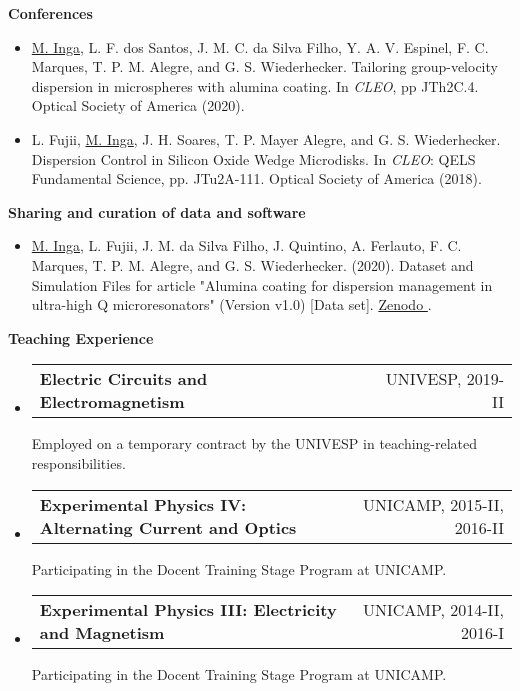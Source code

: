 \documentclass[letterpaper, 12pt]{article}[leftmargin=*]
\makeatletter
\renewcommand{\section}[2]{
  \colorbox{secondary}{\color{white}\raggedbottom\normalsize\textbf{{#1}{\hspace{7pt}#2}}}
}
\newcommand{\resumeEntryStart}{\begin{itemize}[leftmargin=2.5mm]\itemsep8pt}
\newcommand{\resumeEntryEnd}{\end{itemize}}
\newcommand{\resumeItemListStart}{\begin{itemize}[leftmargin=4.5mm]\itemsep-3pt}
\newcommand{\resumeItemListEnd}{\end{itemize}}
\newcommand{\resumeItem}[1]{
  \item\small{
    {#1}
  }
}
\newcommand{\resumeEntryTD}[2]{
  \item[]
    \begin{tabularx}{0.97\textwidth}{X@{\hspace{60pt}}r}
      \textbf{\color{primary}#1} & {\firabook\color{accent}\small#2}
    \end{tabularx}\vspace{2pt}
}
\makeatother
\begin{document}
\textbf{Conferences}
\vspace{-3pt}
\resumeItemListStart
\resumeItem {\underline{M. Inga}, L. F. dos Santos, J. M. C. da Silva Filho, Y. A. V. Espinel, F. C. Marques, T. P. M. Alegre, and G. S. Wiederhecker. Tailoring group-velocity dispersion in microspheres with alumina coating. In \textit{CLEO}, pp JTh2C.4. Optical Society of America (2020). \href{https://www.osapublishing.org/abstract.cfm?uri=CLEO_AT-2020-JTh2C.4}{\faExternalLink}}
\vspace{2pt}
\resumeItem{L. Fujii, \underline{M. Inga}, J. H. Soares, T. P. Mayer Alegre, and G. S. Wiederhecker. Dispersion Control in Silicon Oxide Wedge Microdisks. In \textit{CLEO}: QELS Fundamental Science, pp. JTu2A-111. Optical Society of America (2018). \href{https://www.osapublishing.org/abstract.cfm?uri=CLEO_SI-2018-JTu2A.111}{\faExternalLink}}
\resumeItemListEnd

\textbf{Sharing and curation of data and software}
\vspace{-3pt}
\resumeItemListStart
\resumeItem {\underline{M. Inga}, L. Fujii, J. M. da Silva Filho, J. Quintino, A. Ferlauto, F. C. Marques, T. P. M. Alegre, and G. S. Wiederhecker. (2020). Dataset and Simulation Files for article "Alumina coating for dispersion management in ultra-high Q microresonators" (Version v1.0) [Data set]. \href{https://zenodo.org/record/3932243}{Zenodo \faExternalLink}.}
\resumeItemListEnd

\section{\faPencil}{Teaching Experience}
\resumeEntryStart
\resumeEntryTD
{Electric Circuits and Electromagnetism}{UNIVESP, 2019-II} 
{\footnotesize Employed on a temporary contract by the UNIVESP in teaching-related responsibilities.}
\vspace{-0.25cm}
\resumeEntryTD
{Experimental Physics IV: Alternating Current and Optics}{UNICAMP, 2015-II, 2016-II}
{\footnotesize Participating in the Docent Training Stage Program at UNICAMP.}
\vspace{-0.25cm}
\resumeEntryTD
{Experimental Physics III: Electricity and Magnetism}{UNICAMP, 2014-II, 2016-I}
{\footnotesize Participating in the Docent Training Stage Program at UNICAMP.}
\resumeEntryEnd

\end{document}
